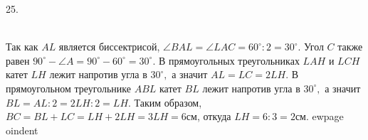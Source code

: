 25. \begin{figure}[ht!]
\end{figure}\\
Так как $AL$ является биссектрисой, $\angle BAL=\angle LAC=60^\circ:2=30^\circ.$ Угол $C$ также равен $90^\circ-\angle A=90^\circ-60^\circ=30^\circ.$ В прямоугольных треугольниках $LAH$ и $LCH$ катет $LH$ лежит напротив угла в $30^\circ,$ а значит $AL=LC=2LH.$ В прямоугольном треугольнике $ABL$ катет $BL$ лежит напротив угла
в $30^\circ,$ а значит $BL=AL:2=2LH:2=LH.$ Таким образом, $BC=BL+LC=LH+2LH=3LH=6$см, откуда $LH=6:3=2$см.
ewpage
oindent

